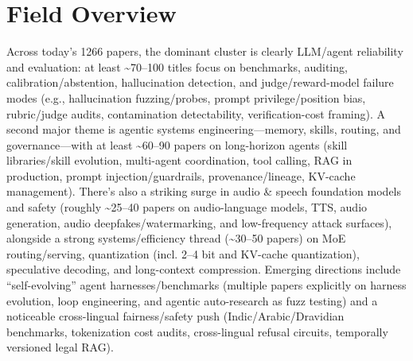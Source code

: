 \documentclass[12pt,letterpaper]{article}
\begin{document}
\section*{Field Overview}
{\footnotesize Across today's 1266 papers, the dominant cluster is clearly LLM/agent reliability and evaluation: at least \textasciitilde{}70--100 titles focus on benchmarks, auditing, calibration/abstention, hallucination detection, and judge/reward-model failure modes (e.g., hallucination fuzzing/probes, prompt privilege/position bias, rubric/judge audits, contamination detectability, verification-cost framing). A second major theme is agentic systems engineering---memory, skills, routing, and governance---with at least \textasciitilde{}60--90 papers on long-horizon agents (skill libraries/skill evolution, multi-agent coordination, tool calling, RAG in production, prompt injection/guardrails, provenance/lineage, KV-cache management). There's also a striking surge in audio \& speech foundation models and safety (roughly \textasciitilde{}25--40 papers on audio-language models, TTS, audio generation, audio deepfakes/watermarking, and low-frequency attack surfaces), alongside a strong systems/efficiency thread (\textasciitilde{}30--50 papers) on MoE routing/serving, quantization (incl. 2--4 bit and KV-cache quantization), speculative decoding, and long-context compression. Emerging directions include ``self-evolving'' agent harnesses/benchmarks (multiple papers explicitly on harness evolution, loop engineering, and agentic auto-research as fuzz testing) and a noticeable cross-lingual fairness/safety push (Indic/Arabic/Dravidian benchmarks, tokenization cost audits, cross-lingual refusal circuits, temporally versioned legal RAG).}
\end{document}
